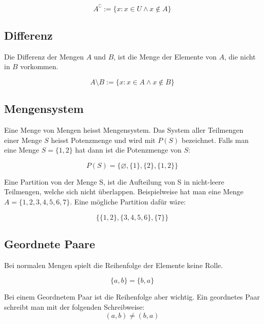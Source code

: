 \documentclass[12pt, a4paper, oneside]{article}
\begin{document}
\begin{equation*}
  A^\complement := \{x : x \in U \land x \notin A\}
\end{equation*}

\subsection{Differenz}
Die Differenz der Mengen $A$ und $B$, ist die Menge der Elemente von $A$, die nicht in $B$ vorkommen.

\begin{equation*}
  A \setminus B := \{x : x \in A \land x \notin B\}
\end{equation*}

\subsection{Mengensystem}
Eine Menge von Mengen heisst Mengensystem. Das System aller Teilmengen einer Menge $S$ heisst Potenzmenge und wird mit $P(S)$ bezeichnet. Falls man eine Menge $S = \{1, 2\}$ hat dann ist die Potenzmenge von $S$:

\begin{equation*}
  P(S) = \{\varnothing, \{1\}, \{2\}, \{1, 2\}\}
\end{equation*}

Eine Partition von der Menge S, ist die Aufteilung von S in nicht-leere Teilmengen, welche sich nicht überlappen. Beispielweise hat man eine Menge $A = \{1, 2, 3, 4, 5, 6, 7\}$. Eine mögliche Partition dafür wäre:

\begin{equation*}
  \{\{1, 2\}, \{3, 4, 5, 6\}, \{7\}\}
\end{equation*}


\subsection{Geordnete Paare}
Bei normalen Mengen spielt die Reihenfolge der Elemente keine Rolle.

\begin{equation*}
  \{a, b\} = \{b, a\}
\end{equation*}

Bei einem Geordnetem Paar ist die Reihenfolge aber wichtig. Ein geordnetes Paar schreibt man mit der folgenden Schreibweise:
\begin{equation*}
  (a, b) \neq (b, a)
\end{equation*}
\end{document}
